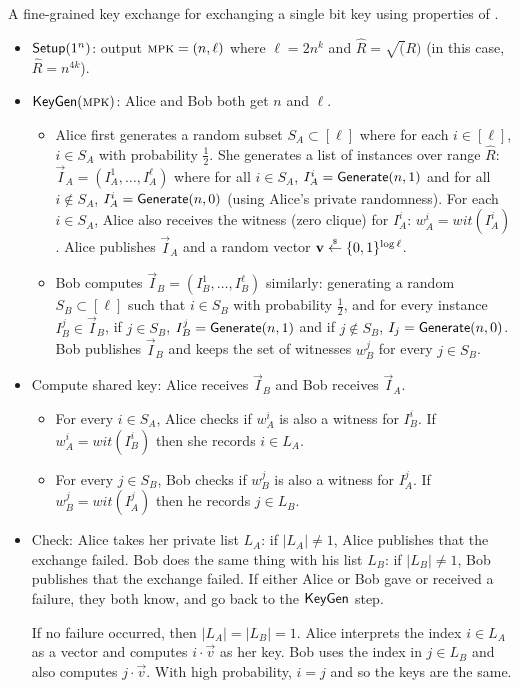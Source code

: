 \begin{construction}\label{const:better-keyxc}
	A fine-grained key exchange for exchanging a single bit key using properties of \zkclique.
	\begin{itemize}
		\item $\mathsf{Setup}(1^n)$: output $\textsc{mpk}= (n, \ell)$ where $\ell = 2n^k$ and $\hat R = \sqrt(R)$ (in this case, $\hat R = n^{4k}$).
		\item $\textsf{KeyGen}(\textsc{mpk})$: Alice and Bob both get $n$ and $\ell$.
		\begin{itemize}
			\item Alice first generates a random subset $S_A \subset [\ell]$ where for each $i \in [\ell]$, $i \in S_A$ with probability $\frac 1 2$. She generates a list of \zkclique instances over range $\hat R$: $\vec I_A = (I_A^1, \ldots, I_A^\ell)$ where for all $i \in S_A$, $I_A^i = \mathsf{Generate}(n,1)$ and for all $i \nin S_A$, $I_A^i = \mathsf{Generate}(n,0)$ (using Alice's private randomness). For each $i \in S_A$, Alice also receives the witness (zero clique) for $I_A^i$: $w_A^i = wit(I_A^i)$. Alice publishes $\vec I_A$ and a random vector $\mathbf v \stackrel{\scriptscriptstyle{\$}}{\gets} \{0,1\}^{ \log \ell }$.
			\item Bob computes $\vec I_B = (I_B^1, \ldots, I_B^\ell)$ similarly: generating a random $S_B \subset [\ell]$ such that $i \in S_B$ with probability $\frac 1 2$, and for every instance $I_B^j \in \vec I_B$, if $j \in S_B$, $I_B^j = \mathsf{Generate}(n,1)$ and if $j \nin S_B$, $I_j = \mathsf{Generate}(n,0)$. Bob publishes $\vec I_B$ and keeps the set of witnesses $w_B^j$ for every $j \in S_B$.
		\end{itemize}
		\item Compute shared key: Alice receives $\vec I_B$ and Bob receives $\vec I_A$.
		\begin{itemize}
			\item For every $i \in S_A$, Alice checks if $w_A^i$ is also a witness for $I_B^i$. If $w_A^i = wit(I_B^i)$ then she records $i \in L_A$.
			\item For every $j \in S_B$, Bob checks if $w_B^j$ is also a witness for $I_A^j$. If $w_B^j = wit(I_A^j)$ then he records $j \in L_B$.
		\end{itemize}
		\item Check: Alice takes her private list $L_A$: if $|L_A| \neq 1$, Alice publishes that the exchange failed. Bob does the same thing with his list $L_B$: if $|L_B| \neq 1$, Bob publishes that the exchange failed. If either Alice or Bob gave or received a failure, they both know, and go back to the $\textsf{KeyGen}$ step.
		
		If no failure occurred, then $|L_A| = |L_B| = 1$. Alice interprets the index $i \in L_A$ as a vector and computes $i \cdot \vec v$ as her key. Bob uses the index in $j \in L_B$ and also computes $j \cdot \vec v$. With high probability, $i = j$ and so the keys are the same.
	\end{itemize}
\end{construction}

